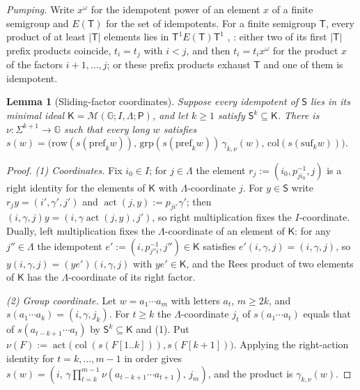 \documentclass[11pt]{article}
\numberwithin{equation}{section}
\theoremstyle{plain}
\newtheorem{lemma}[theorem]{Lemma}
\theoremstyle{definition}
\theoremstyle{remark}
\theoremstyle{plain}
\begin{document}
\emph{Pumping.}  Write $x^\omega$ for the idempotent power of an element $x$ of a
finite semigroup and $E(\mathsf T)$ for the set of idempotents.  For a finite
semigroup $\mathsf T$, every product of at least $|\mathsf T|$ elements lies in
$\mathsf T^1E(\mathsf T)\mathsf T^1$ \cite[Lemma~2.2]{AlmeidaEtAl2009}, \cite{Pin1986}:
either two of its first $|\mathsf T|$ prefix products coincide, $t_i=t_j$ with
$i<j$, and then $t_i=t_ix^\omega$ for the product $x$ of the factors
$i+1,\ldots,j$; or these prefix products exhaust $\mathsf T$ and one of them is
idempotent.

\begin{lemma}[Sliding-factor coordinates]
\label{lem:rees}
Suppose every idempotent of $\mathsf S$ lies in its minimal ideal
$\mathsf K=\mathcal M(\mathbb G;I,\Lambda;\mathsf P)$, and let $k\ge1$ satisfy
$\mathsf S^k\subseteq\mathsf K$.  There is $\nu:\Sigma^{k+1}\to\mathbb G$ such that every
long $w$ satisfies
$s(w)=\bigl(\mathrm{row}(s(\mathrm{pref}_kw)),\,\mathrm{grp}(s(\mathrm{pref}_kw))\,\gamma_{k,\nu}(w),\,
\mathrm{col}(s(\mathrm{suf}_kw))\bigr)$.
\end{lemma}

\begin{proof}
\emph{(1) Coordinates.}  Fix $i_0\in I$; for $j\in\Lambda$ the element
$r_j:=(i_0,p_{ji_0}^{-1},j)$ is a right identity for the elements of $\mathsf K$ with
$\Lambda$-coordinate $j$.  For $y\in \mathsf S$ write $r_jy=(i',\gamma',j')$ and
$\operatorname{act}(j,y):=p_{ji'}\gamma'$; then
$(i,\gamma,j)y=(i,\gamma\operatorname{act}(j,y),j')$, so right multiplication fixes the
$I$-coordinate.  Dually, left multiplication fixes the $\Lambda$-coordinate of an
element of $\mathsf K$: for any $j''\in\Lambda$ the idempotent
$e':=(i,p_{j''i}^{-1},j'')\in\mathsf K$ satisfies $e'(i,\gamma,j)=(i,\gamma,j)$, so
$y(i,\gamma,j)=(ye')(i,\gamma,j)$ with $ye'\in\mathsf K$, and the Rees product of two
elements of $\mathsf K$ has the $\Lambda$-coordinate of its right factor.

\emph{(2) Group coordinate.}  Let $w=a_1\cdots a_m$ with letters $a_t$, $m\ge2k$, and
$s(a_1\cdots a_k)=(i,\gamma,j_k)$.  For $t\ge k$ the $\Lambda$-coordinate $j_t$
of $s(a_1\cdots a_t)$ equals that of $s(a_{t-k+1}\cdots a_t)$ by $\mathsf S^k\subseteq\mathsf K$
and (1).  Put
$\nu(F):=\operatorname{act}\bigl(\operatorname{col}(s(F[1..k])),s(F[k+1])\bigr)$.  Applying the
right-action identity for $t=k,\ldots,m-1$ in order gives
$s(w)=(i,\,\gamma\prod_{t=k}^{m-1}\nu(a_{t-k+1}\cdots a_{t+1}),\,j_m)$, and the
product is $\gamma_{k,\nu}(w)$.
\end{proof}
\end{document}
